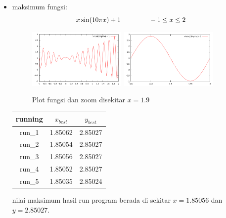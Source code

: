 \documentclass[paper=a4, fontsize=11pt]{scrartcl}
\numberwithin{equation}{section} %
\numberwithin{figure}{section} %
\numberwithin{table}{section} %
\begin{document}
\begin{itemize}
\vspace{1.5cm}
\item maksimum fungsi:
\begin{equation*}
x \sin(10 \pi x) + 1 \hspace{1.5cm} -1 \leq x \leq 2
\end{equation*}
\begin{figure}
	\centering
	\includegraphics[width=0.45\textwidth]{kurva2.png}
	\includegraphics[width=0.45\textwidth]{kurva2zoom.png}
	\caption{Plot fungsi dan zoom disekitar $x = 1.9$}
\end{figure}

\begin{table}[ht]
\center
\begin{tabular}{c c c}
\hline
running & $x_{best}$ & $y_{best}$ \\ [0.5ex]
\hline 
run\_1 & 1.85062 & 2.85027 \\
run\_2 & 1.85054 & 2.85027 \\
run\_3 & 1.85056 & 2.85027 \\
run\_4 & 1.85052 & 2.85027 \\
run\_5 & 1.85035 & 2.85024 \\ [1ex]
\hline 
\end{tabular}
\end{table}
nilai maksimum hasil run program berada di sekitar $x = 1.85056$ dan $y = 2.85027$.


\end{itemize}
\end{document}
